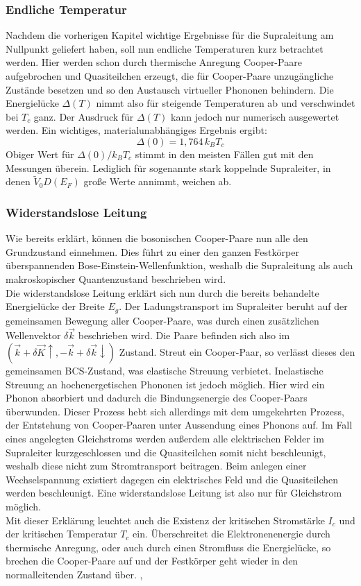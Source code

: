 		\subsubsection{Endliche Temperatur}
Nachdem die vorherigen Kapitel wichtige Ergebnisse für die Supraleitung am 
Nullpunkt geliefert haben, soll nun endliche Temperaturen kurz betrachtet werden.
Hier werden schon durch thermische Anregung Cooper-Paare aufgebrochen und 
Quasiteilchen erzeugt, die für Cooper-Paare unzugängliche Zustände besetzen und
so den Austausch virtueller Phononen behindern. Die Energielücke $\Delta(T)$ nimmt
also für steigende Temperaturen ab und verschwindet bei $T_c$ ganz. Der Ausdruck
für $\Delta(T)$ kann jedoch nur numerisch ausgewertet werden. Ein wichtiges, 
materialunabhängiges Ergebnis ergibt:
\[
	\Delta(0) = 1,764 \, k_B T_c
\]
Obiger Wert für $\Delta(0)/k_BT_c$ stimmt in den meisten Fällen gut mit den 
Messungen überein. Lediglich für sogenannte stark koppelnde Supraleiter, in denen
$\tilde{V}_0 D(E_F)$ große Werte annimmt, weichen ab. \cite{hunklinger}

		\subsubsection{Widerstandslose Leitung}
Wie bereits erklärt, können die bosonischen Cooper-Paare nun alle den Grundzustand
einnehmen. Dies führt zu einer den ganzen Festkörper überspannenden 
Bose-Einstein-Wellenfunktion, weshalb die Supraleitung als auch makroskopischer
Quantenzustand beschrieben wird. \\
Die widerstandslose Leitung erklärt sich nun durch die bereits behandelte 
Energielücke der Breite $E_g$. Der Ladungstransport im Supraleiter beruht auf
der gemeinsamen Bewegung aller Cooper-Paare, was durch einen zusätzlichen 
Wellenvektor $\delta \vec{k}$ beschrieben wird. Die Paare befinden sich also
im $(\vec{k} + \delta \vec{K} \uparrow, - \vec{k} + \delta \vec{k} \downarrow)$
Zustand. Streut ein Cooper-Paar, so verlässt dieses den gemeinsamen BCS-Zustand,
was elastische Streuung verbietet. Inelastische Streuung an hochenergetischen
Phononen ist jedoch möglich. Hier wird ein Phonon absorbiert und dadurch die 
Bindungsenergie des Cooper-Paars überwunden. Dieser Prozess hebt sich allerdings
mit dem umgekehrten Prozess, der Entstehung von Cooper-Paaren unter Aussendung eines
Phonons auf. Im Fall eines angelegten Gleichstroms werden außerdem alle 
elektrischen Felder im Supraleiter kurzgeschlossen und die Quasiteilchen somit nicht
beschleunigt, weshalb diese nicht zum Stromtransport beitragen. Beim anlegen einer
Wechselspannung existiert dagegen ein elektrisches Feld und die Quasiteilchen werden
beschleunigt. Eine widerstandslose Leitung ist also nur für Gleichstrom möglich.\\
Mit dieser Erklärung leuchtet auch die Existenz der kritischen Stromstärke $I_c$ 
und der kritischen Temperatur $T_c$ ein. Überschreitet die Elektronenenergie durch
thermische Anregung, oder auch durch einen Stromfluss die Energielücke, so brechen
die Cooper-Paare auf und der Festkörper geht wieder in den normalleitenden Zustand
über. \cite{hunklinger}, \cite{suprawiki}

